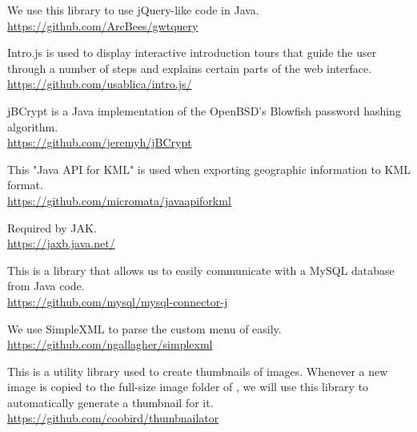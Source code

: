 \begin{description}[align=left,style=nextline,leftmargin=*,labelsep=\parindent,font=\bfseries]
	\item[GwtQuery] We use this library to use jQuery-like code in Java. \\\url{https://github.com/ArcBees/gwtquery}
	\item[Intro.js] Intro.js is used to display interactive introduction tours that guide the user through a number of steps and explains certain parts of the web interface. \\\url{https://github.com/usablica/intro.js/}
	\item[jBCrypt] jBCrypt is a Java implementation of the OpenBSD's Blowfish password hashing algorithm. \\\url{https://github.com/jeremyh/jBCrypt}
	\item[JAK] This "Java API for KML" is used when exporting geographic information to KML format. \\\url{https://github.com/micromata/javaapiforkml}
	\item[JAXB] Required by JAK.\\\url{https://jaxb.java.net/}
	\item[MySQL Connector/J] This is a library that allows us to easily communicate with a MySQL database from Java code. \\\url{https://github.com/mysql/mysql-connector-j}
	\item[SimpleXML] We use SimpleXML to parse the custom menu of {\germinate} easily. \\\url{https://github.com/ngallagher/simplexml}
	\item[Thumbnailator] This is a utility library used to create thumbnails of images. Whenever a new image is copied to the full-size image folder of {\germinate}, we will use this library to automatically generate a thumbnail for it. \\\url{https://github.com/coobird/thumbnailator}
\end{description}